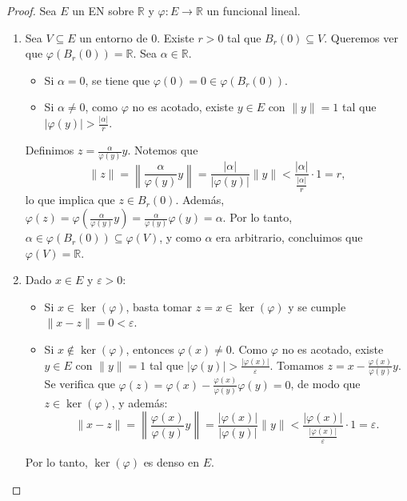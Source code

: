 \documentclass{article}
\theoremstyle{definition}
\newcommand{\R}{\mathbb{R}}
\begin{document}
\begin{proof}
    Sea \(E\) un EN sobre \( \R \) y \( \varphi:E\to\R \) un funcional lineal.
    \begin{enumerate}
        \item Sea \(V \subseteq E\) un entorno de \(0\). Existe \(r > 0\) tal que \(B_r(0) \subseteq V\). Queremos ver que \(\varphi(B_r(0)) = \R \). Sea \(\alpha \in \R \).
              \begin{itemize}
                  \item Si \(\alpha = 0\), se tiene que \(\varphi(0) = 0 \in \varphi(B_r(0))\).
                  \item Si \(\alpha \neq 0\), como \( \varphi \) no es acotado, existe \(y \in E\) con \( \|y\| = 1 \) tal que \(|\varphi(y)| > \frac{|\alpha|}{r}\).
              \end{itemize}
              Definimos \(z = \frac{\alpha}{\varphi(y)} y\). Notemos que
              \[
                  \|z\| = \left \| \frac{\alpha}{\varphi(y)} y \right \| = \frac{|\alpha|}{|\varphi(y)|} \|y\| < \frac{|\alpha|}{\frac{|\alpha|}{r}} \cdot 1 = r,
              \]
              lo que implica que \(z \in B_r(0)\). Además, \( \varphi(z) = \varphi\left(\frac{\alpha}{\varphi(y)} y\right) = \frac{\alpha}{\varphi(y)} \varphi(y) = \alpha \).
              Por lo tanto, \(\alpha \in \varphi(B_r(0)) \subseteq \varphi(V)\), y como \( \alpha \) era arbitrario, concluimos que \( \varphi(V) = \R \).

        \item Dado \(x \in E\) y \(\varepsilon > 0\):
              \begin{itemize}
                  \item Si \(x \in \ker(\varphi)\), basta tomar \(z = x \in \ker(\varphi)\) y se cumple \( \|x - z\| = 0 < \varepsilon \).
                  \item Si \(x \notin \ker(\varphi)\), entonces \(\varphi(x) \neq 0\). Como \( \varphi \) no es acotado, existe \(y \in E\) con \( \|y\| = 1 \) tal que \(|\varphi(y)| > \frac{|\varphi(x)|}{\varepsilon}\).
                        Tomamos \(z = x - \frac{\varphi(x)}{\varphi(y)} y\). Se verifica que \(\varphi(z) = \varphi(x) - \frac{\varphi(x)}{\varphi(y)} \varphi(y) = 0\), de modo que \(z \in \ker(\varphi)\), y además:
                        \[
                            \|x - z\| = \left \| \frac{\varphi(x)}{\varphi(y)} y \right \| = \frac{|\varphi(x)|}{|\varphi(y)|} \|y\| < \frac{|\varphi(x)|}{\frac{|\varphi(x)|}{\varepsilon}} \cdot 1 = \varepsilon.
                        \]
              \end{itemize}
              Por lo tanto, \(\ker(\varphi)\) es denso en \(E\).


\end{enumerate}
\end{proof}
\end{document}
